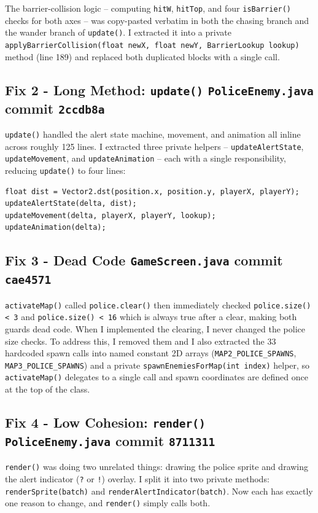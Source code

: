 \documentclass[10pt]{article}
\begin{document}
The barrier-collision logic -- computing \texttt{hitW}, \texttt{hitTop}, and four \texttt{isBarrier()} checks for both axes -- was copy-pasted verbatim in both the chasing branch and the wander branch of \texttt{update()}. I extracted it into a private \texttt{applyBarrierCollision(float newX, float newY, BarrierLookup lookup)} method (line 189) and replaced both duplicated blocks with a single call.

\subsection*{Fix 2 - Long Method: \texttt{update()} \quad \normalfont\texttt{PoliceEnemy.java} \hfill commit \texttt{2ccdb8a}}

\texttt{update()} handled the alert state machine, movement, and animation all inline across roughly 125 lines. I extracted three private helpers -- \texttt{updateAlertState}, \texttt{updateMovement}, and \texttt{updateAnimation} -- each with a single responsibility, reducing \texttt{update()} to four lines:

\begin{lstlisting}
float dist = Vector2.dst(position.x, position.y, playerX, playerY);
updateAlertState(delta, dist);
updateMovement(delta, playerX, playerY, lookup);
updateAnimation(delta);
\end{lstlisting}

\subsection*{Fix 3 - Dead Code \quad \normalfont\texttt{GameScreen.java} \hfill commit \texttt{cae4571}}

\texttt{activateMap()} called \texttt{police.clear()} then immediately checked \texttt{police.size() < 3} and \texttt{police.size() < 16} which is always true after a clear, making both guards dead code. When I implemented the clearing, I never changed the police size checks. To address this, I removed them and I also extracted the 33 hardcoded spawn calls into named constant 2D arrays (\texttt{MAP2\_POLICE\_SPAWNS}, \texttt{MAP3\_POLICE\_SPAWNS}) and a private \texttt{spawnEnemiesForMap(int index)} helper, so \texttt{activateMap()} delegates to a single call and spawn coordinates are defined once at the top of the class.

\subsection*{Fix 4 - Low Cohesion: \texttt{render()} \quad \normalfont\texttt{PoliceEnemy.java} \hfill commit \texttt{8711311}}

\texttt{render()} was doing two unrelated things: drawing the police sprite and drawing the alert indicator (\texttt{?} or \texttt{!}) overlay. I split it into two private methods: \texttt{renderSprite(batch)} and \texttt{renderAlertIndicator(batch)}. Now each has exactly one reason to change, and \texttt{render()} simply calls both.
\end{document}
